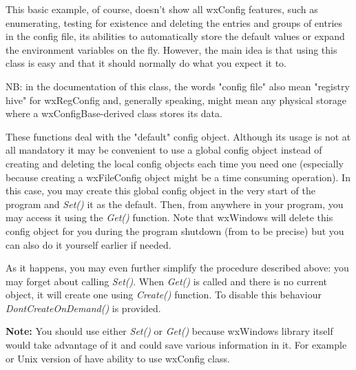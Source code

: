 This basic example, of course, doesn't show all wxConfig features, such as
enumerating, testing for existence and deleting the entries and groups of
entries in the config file, its abilities to automatically store the default
values or expand the environment variables on the fly. However, the main idea
is that using this class is easy and that it should normally do what you
expect it to.

NB: in the documentation of this class, the words "config file" also mean
"registry hive" for wxRegConfig and, generally speaking, might mean any
physical storage where a wxConfigBase-derived class stores its data.


\label{wxconfigstaticfunctions}

These functions deal with the "default" config object. Although its usage is
not at all mandatory it may be convenient to use a global config object
instead of creating and deleting the local config objects each time you need
one (especially because creating a wxFileConfig object might be a time
consuming operation). In this case, you may create this global config object
in the very start of the program and {\it Set()} it as the default. Then, from
anywhere in your program, you may access it using the {\it Get()} function.
Note that wxWindows will delete this config object for you during the program
shutdown (from  to be precise) but you can
also do it yourself earlier if needed.

As it happens, you may even further simplify the procedure described above:
you may forget about calling {\it Set()}. When {\it Get()} is called and there
is no current object, it will create one using {\it Create()} function. To
disable this behaviour {\it DontCreateOnDemand()} is provided.

{\bf Note:} You should use either {\it Set()} or {\it Get()} because wxWindows
library itself would take advantage of it and could save various information
in it. For example  or Unix version
of  have ability to use wxConfig class.

\\
\\
\\


